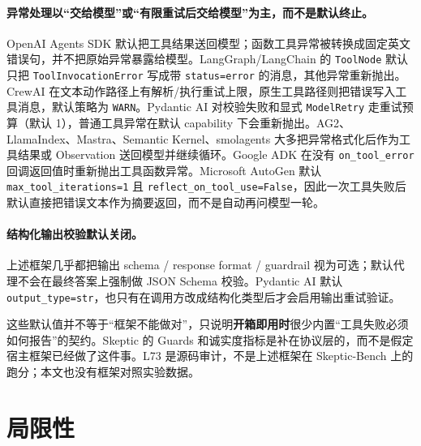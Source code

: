 \documentclass[11pt,a4paper]{article}
\begin{document}
\paragraph{异常处理以“交给模型”或“有限重试后交给模型”为主，而不是默认终止。}
OpenAI Agents SDK 默认把工具结果送回模型；函数工具异常被转换成固定英文错误句，并不把原始异常暴露给模型。LangGraph/LangChain 的 \texttt{ToolNode} 默认只把 \texttt{ToolInvocationError} 写成带 \texttt{status=error} 的消息，其他异常重新抛出。CrewAI 在文本动作路径上有解析/执行重试上限，原生工具路径则把错误写入工具消息，默认策略为 \texttt{WARN}。Pydantic AI 对校验失败和显式 \texttt{ModelRetry} 走重试预算（默认 1），普通工具异常在默认 capability 下会重新抛出。AG2、LlamaIndex、Mastra、Semantic Kernel、smolagents 大多把异常格式化后作为工具结果或 Observation 送回模型并继续循环。Google ADK 在没有 \texttt{on\_tool\_error} 回调返回值时重新抛出工具函数异常。Microsoft AutoGen 默认 \texttt{max\_tool\_iterations=1} 且 \texttt{reflect\_on\_tool\_use=False}，因此一次工具失败后默认直接把错误文本作为摘要返回，而不是自动再问模型一轮。

\paragraph{结构化输出校验默认关闭。}
上述框架几乎都把输出 schema / response format / guardrail 视为可选；默认代理不会在最终答案上强制做 JSON Schema 校验。Pydantic AI 默认 \texttt{output\_type=str}，也只有在调用方改成结构化类型后才会启用输出重试验证。

这些默认值并不等于“框架不能做对”，只说明\textbf{开箱即用时}很少内置“工具失败必须如何报告”的契约。Skeptic 的 Guards 和诚实度指标是补在协议层的，而不是假定宿主框架已经做了这件事。L73 是源码审计，不是上述框架在 Skeptic-Bench 上的跑分；本文也没有框架对照实验数据。

\section{局限性}
\end{document}
